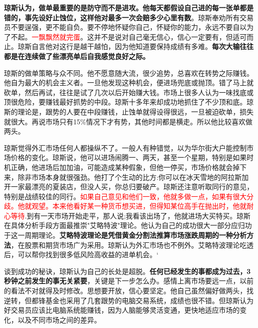\textbf{琼斯认为，做单最重要的是防守而不是进攻。他每天都假设自己进的每一张单都是错的，事先设好止蚀位，这样他对最多一次会赔多少心里有数}。琼斯奉劝所有交易员不要逞强，更不能自负。要不停地怀疑你自己，怀疑你的能力，永远不要自以为了不起。\textcolor{red}{一飘飘然就完蛋}。这并不是说对自己毫无信心，信心一定要有，但适可而止。琼斯自言他对这行是越干越怕，因为他知道要保持成绩有多难。\textbf{每次大输往往都是在连续做了些漂亮单后自我感觉良好之际。}

琼斯的做单策略与众不同。他不愿意随大流，很少追势，总喜欢在转势之际赚钱。他自为最大的机会主义者。一旦他发现这种机会，便进场兜底或抛顶。错了马上就砍单，然后再试，往往是试了几次以后开始赚大钱。市场上很多人认为一味找底或顶很危险，要赚钱最好抓势的中段。琼斯十多年来却成功地抓住了不少顶和底。琼斯的理论是，跟势的人要在中段赚钱，止蚀单就得设得很远，一旦被迫砍单，损失就很大。再说市场只有15\%情况下才有势，其他时间都是横走。所以他比较喜欢做两头。

琼斯觉得外汇市场任何人都操纵不了。一般人有种错觉，以为华尔街大户能控制市场价格的变化。琼斯说，他可以进场闹腾一、两天，甚至一个星期，特别是如果时机正确，他进场后加加油，可能造成某种假象，但他一停买，市场价格就会掉下来，除非市场本身就很强劲。他打了个生动的比方:你可以在冰天雪地的阿拉斯加开一家最漂亮的夏装店，但没人买，你总归要破产。琼斯还注意听取同行的意见，特别是战绩较佳的同行。\textcolor{red}{如果自己意见和他们一致，他就多做一点，如果有很大分歧。他就观望。本来他看好某一种货币想买进，但得知某位高手在抛出时，他就耐心等待}.到有一天市场开始走平，那人说;我看该出场了，他就进场大买特买。琼斯在具体分析手段方面最推崇"艾略特波"理论。他认为自己的成功很大一部分应归功于这一周期理论。\textbf{艾略特波理论是凭借黄金分割法推算市场涨跌周期的一种分析方法}，在股票和期货市场广为采用。琼斯认为外汇市场也不例外。艾略特波理论吃透后，可以帮你找到很多低风险高收益的进单机会。`


谈到成功的秘诀，琼斯认为自己的长处是超脱。\textbf{任何已经发生的事都成为过去，3秒钟之前发生的事无关紧要}，关键是下一步怎么办。感情上离市场要远一点，以前的看法不对就得及时修改。思想要开放，信心要坚定。他自己虽然偏好做两头，找逆转，但都锋基金也采用了几套跟势的电脑交易系统，成绩也很不错。但琼斯认为好交易员应该比电脑系统能赚钱，因为人脑能够灵活变通，更快地适应市场的变化，以及不同市场之间的差异。


